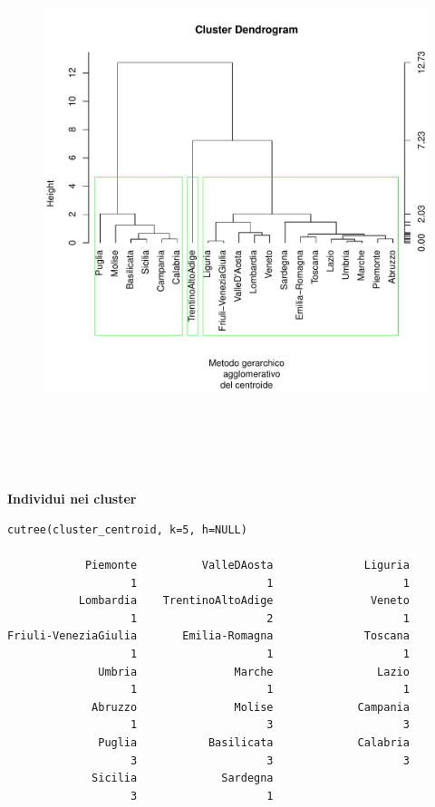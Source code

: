 \vspace{5mm}
\begin{figure}[!htbp]
    \centering
    \includegraphics[height=16cm]{ProgettoSAD/capitoli/images/clustering/dendro_clcentr_sudd.pdf}
\end{figure}
\vspace{5mm}

\noindent \textbf{Individui nei cluster}

\vspace{5mm}
\begin{lstlisting}
cutree(cluster_centroid, k=5, h=NULL)

            Piemonte          ValleDAosta              Liguria 
                   1                    1                    1 
           Lombardia    TrentinoAltoAdige               Veneto 
                   1                    2                    1 
Friuli-VeneziaGiulia       Emilia-Romagna              Toscana 
                   1                    1                    1 
              Umbria               Marche                Lazio 
                   1                    1                    1 
             Abruzzo               Molise             Campania 
                   1                    3                    3 
              Puglia           Basilicata             Calabria 
                   3                    3                    3 
             Sicilia             Sardegna 
                   3                    1 
\end{lstlisting}
\vspace{5mm}

